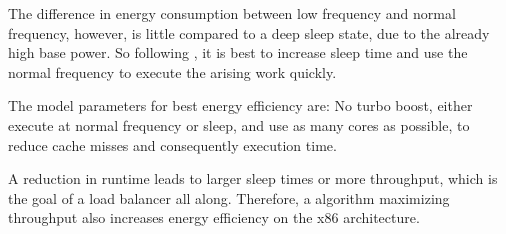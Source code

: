 The difference in energy consumption between low frequency and normal
frequency, however, is little compared to a deep sleep state, due to the
already high base power.
So following \cite{imes_poet_2015}, it is best to increase sleep time and use
the normal frequency to execute the arising work quickly.

The model parameters for best energy efficiency are:
No turbo boost, either execute at normal frequency or sleep, and use as many
cores as possible, to reduce cache misses and consequently execution time.

A reduction in runtime leads to larger sleep times or more throughput, which is
the goal of a load balancer all along.
Therefore, a algorithm maximizing throughput also increases energy efficiency
on the x86 architecture.


